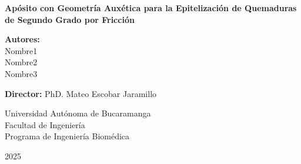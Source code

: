 \documentclass[12pt,final]{aunarAPA}
\begin{document}
\begin{titlepage}
\centering
\vspace*{1cm}
{\bfseries\normalsize
Apósito con Geometría Auxética para la Epitelización de Quemaduras de Segundo Grado por Fricción\par}

\vspace{3.5cm}
{\bfseries\normalsize Autores:}\\[0.6cm]
{\normalsize
Nombre1\\
Nombre2\\
Nombre3}

\vspace{2.2cm}
{\bfseries\normalsize Director:} PhD. Mateo Escobar Jaramillo

\vspace{3.5cm}
{\normalsize
Universidad Autónoma de Bucaramanga\\
Facultad de Ingeniería\\
Programa de Ingeniería Biomédica}

\vfill
{\normalsize 2025}
\end{titlepage}

\setcounter{secnumdepth}{4}
\setcounter{tocdepth}{3}
\setlength{\parindent}{1.27cm}

\clearpage
{}
\setcounter{page}{1} %

\newpage
\tableofcontents
\newpage
\listoffigures
\newpage
\listoftables

\newpage 
\newpage 
\newpage 
\newpage 

\clearpage
{} %

\newpage 


\newpage 


\newpage 


\newpage 


\newpage 


\newpage 

\newpage 

\newpage 

\newpage 

\end{document}
